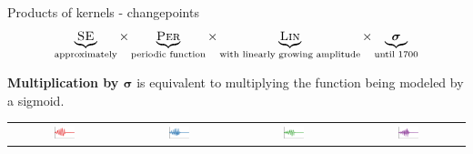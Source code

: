 \begin{frame}{Products of kernels - changepoints}
  \begin{align*}
    \underbrace{{\textsc{SE}}}_{\textnormal{\scriptsize approximately}} \times
    \underbrace{{\textsc{Per}}}_{\textnormal{\scriptsize periodic function}} \times 
    \underbrace{{\textsc{Lin}}}_{\textnormal{\scriptsize with linearly growing amplitude}} \times 
    \underbrace{\boldsymbol{\sigma}}_{\textnormal{\scriptsize until 1700}}
  \end{align*}
  
  \vspace{\baselineskip}
  
  {\bf Multiplication by $\boldsymbol\sigma$} is equivalent to multiplying the function being modeled by a sigmoid.
  
  \vspace{\baselineskip}
  
  \begin{block}{}
    \begin{tabular}{cccc}
      \includegraphics[width=0.2\textwidth]{figures/trans_samples/draw_41} &
      \includegraphics[width=0.2\textwidth]{figures/trans_samples/draw_42} &
      \includegraphics[width=0.2\textwidth]{figures/trans_samples/draw_43} &
      \includegraphics[width=0.2\textwidth]{figures/trans_samples/draw_44}
    \end{tabular}
  \end{block}
\end{frame}

